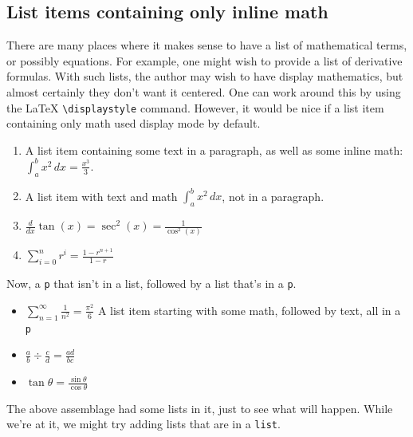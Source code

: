 \documentclass[pdflatex]{sn-jnl}
\theoremstyle{thmstyleone}%
\theoremstyle{thmstyletwo}%
\theoremstyle{thmstylethree}%
\newcommand{\mono}[1]{\texttt{#1}}
\numberwithin{equation}{section}
\begin{document}
\subsection{List items containing only inline math}\label{test-second}%
\begin{assemblage}\label{math-list-test}%
%
There are many places where it makes sense to have a list of mathematical terms, or possibly equations. For example, one might wish to provide a list of derivative formulas. With such lists, the author may wish to have display mathematics, but almost certainly they don't want it centered. One can work around this by using the \LaTeX{} \mono{\textbackslash{}displaystyle} command. However, it would be nice if a list item containing only math used display mode by default.%
\par
%
\begin{enumerate}
\item{}A list item containing some text in a paragraph, as well as some inline math: \(\int_a^b x^2\,dx = \frac{x^3}{3}\).%
\item{}A list item with text and math \(\int_a^b x^2\,dx\), not in a paragraph.%
\item{}\(\displaystyle \frac{d}{dx}\tan(x) = \sec^2(x) = \frac{1}{\cos^2(x)}\)%
\item{}\(\displaystyle \sum_{i=0}^n r^i = \frac{1-r^{n+1}}{1-r}\)%
\end{enumerate}
%
\par
Now, a \mono{p} that isn't in a list, followed by a list that's in a \mono{p}.%
\par
%
\begin{itemize}[label=\textbullet]
\item{}\(\sum_{n=1}^\infty\frac{1}{n^2}=\frac{\pi^2}{6}\) A list item starting with some math, followed by text, all in a \mono{p}%
\item{}\(\displaystyle \frac{a}{b}\div \frac{c}{d} = \frac{ad}{bc}\)%
\item{}\(\displaystyle \tan\theta = \frac{\sin\theta}{\cos\theta}\)%
\end{itemize}
%
\end{assemblage}
The above assemblage had some lists in it, just to see what will happen. While we're at it, we might try adding lists that are in a \mono{list}.%
\end{document}
